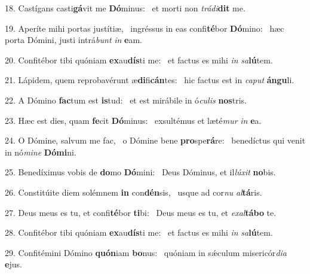 18. Castígans casti\textbf{gá}vit me \textbf{Dó}minus: \ast\  et morti non \textit{trá}\textit{di}\textbf{dit} me.\

19. Aperíte mihi portas justítiæ, \dag\  ingréssus in eas confi\textbf{té}bor \textbf{Dó}mino: \ast\  hæc porta Dómini, justi intrá\textit{bunt} \textit{in} \textbf{e}am.\

20. Confitébor tibi quóniam \textbf{ex}au\textbf{dís}ti me: \ast\  et factus es mihi \textit{in} \textit{sa}\textbf{lú}tem.\

21. Lápidem, quem reprobavérunt æ\textbf{di}fi\textbf{cán}tes: \ast\  hic factus est in \textit{ca}\textit{put} \textbf{án}\textbf{gu}li.\

22. A Dómino \textbf{fac}tum est \textbf{is}tud: \ast\  et est mirábile in ó\textit{cu}\textit{lis} \textbf{nos}tris.\

23. Hæc est dies, quam \textbf{fe}cit \textbf{Dó}minus: \ast\  exsultémus et læté\textit{mur} \textit{in} \textbf{e}a.\

24. O Dómine, salvum me fac, \dag\  o Dómine bene \textbf{pro}spe\textbf{rá}re: \ast\  benedíctus qui venit in nó\textit{mi}\textit{ne} \textbf{Dó}\textbf{mi}ni.\

25. Benedíximus vobis de \textbf{do}mo \textbf{Dó}mini: \ast\  Deus Dóminus, et il\textit{lú}\textit{xit} \textbf{no}bis.\

26. Constitúite diem solémnem \textbf{in} con\textbf{dén}sis, \ast\  usque ad cor\textit{nu} \textit{al}\textbf{tá}ris.\

27. Deus meus es tu, et confi\textbf{té}bor \textbf{ti}bi: \ast\  Deus meus es tu, et \textit{ex}\textit{al}\textbf{tá}\textbf{bo} te.\

28. Confitébor tibi quóniam \textbf{ex}au\textbf{dís}ti me: \ast\  et factus es mihi \textit{in} \textit{sa}\textbf{lú}tem.\

29. Confitémini Dómino \textbf{quón}iam \textbf{bo}nus: \ast\  quóniam in sǽculum misericór\textit{di}\textit{a} \textbf{e}jus.\

